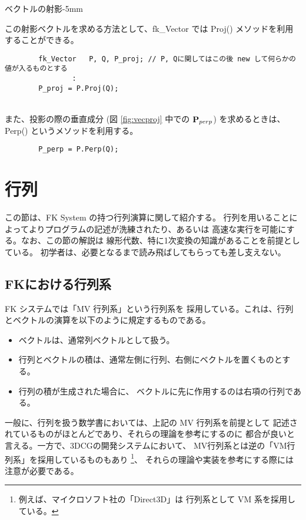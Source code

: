 	{ベクトルの射影}{-5mm}

この射影ベクトルを求める方法として、fk\_Vector では
Proj() メソッドを利用することができる。
\\
\begin{screen}
\begin{verbatim}
        fk_Vector   P, Q, P_proj; // P, Qに関してはこの後 new して何らかの値が入るものとする
                :
        P_proj = P.Proj(Q);
\end{verbatim}
\end{screen}
~ \\	
また、投影の際の垂直成分 (図 \ref{fig:vecproj} 中での \(\mathbf{P}_{perp}\))
を求めるときは、Perp() というメソッドを利用する。
\\
\begin{screen}
\begin{verbatim}
        P_perp = P.Perp(Q);
\end{verbatim}
\end{screen}
\section{行列}
この節は、FK System の持つ行列演算に関して紹介する。
行列を用いることによってよりプログラムの記述が洗練されたり、あるいは
高速な実行を可能にする。なお、この節の解説は
線形代数、特に1次変換の知識があることを前提としている。
初学者は、必要となるまで読み飛ばしてもらっても差し支えない。

\subsection{FKにおける行列系}
FK システムでは「MV 行列系」という行列系を
採用している。これは、行列とベクトルの演算を以下のように規定するものである。
\begin{itemize}
 \item ベクトルは、通常列ベクトルとして扱う。
 \item 行列とベクトルの積は、通常左側に行列、右側にベクトルを置くものとする。
 \item 行列の積が生成された場合に、
	ベクトルに先に作用するのは右項の行列である。
\end{itemize}
一般に、行列を扱う数学書においては、上記の MV 行列系を前提として
記述されているものがほとんどであり、それらの理論を参考にするのに
都合が良いと言える。一方で、3DCGの開発システムにおいて、
MV行列系とは逆の「VM行列系」を採用しているものもあり
\footnote{例えば、マイクロソフト社の「Direct3D」は
行列系として VM 系を採用している。}、
それらの理論や実装を参考にする際には注意が必要である。

